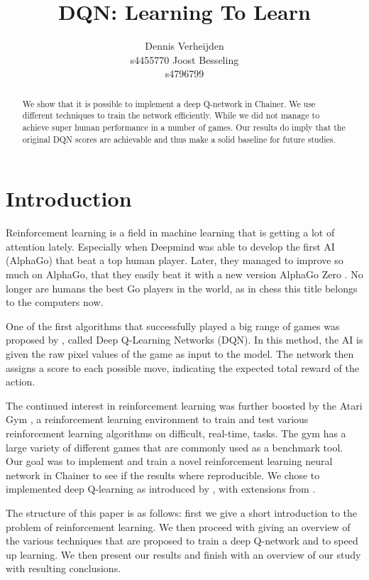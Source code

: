 \documentclass{article}
\title{DQN: Learning To Learn}
\author{
  Dennis Verheijden\\
  s4455770
  \And
  Joost Besseling\\
  s4796799
}
\begin{document}

\maketitle

\begin{abstract}
We show that it is possible to implement a deep Q-network in Chainer. We use different techniques to train the network efficiently. While we did not manage to achieve super human performance in a number of games. Our results do imply that the original DQN scores are achievable and thus make a solid baseline for future studies.
\end{abstract}

\section{Introduction}
Reinforcement learning is a field in machine learning that is getting a lot of attention lately. Especially when Deepmind was able to develop the first AI (AlphaGo) that beat a top human player. Later, they managed to improve so much on AlphaGo, that they easily beat it with a new version AlphaGo Zero \cite{silver2017mastering}. No longer are humans the best Go players in the world, as in chess this title belongs to the computers now.

One of the first algorithms that successfully played a big range of games was proposed by \citep{mnih2013playing}, called Deep Q-Learning Networks (DQN). In this method, the AI is given the raw pixel values of the game as input to the model. The network then assigns a score to each possible move, indicating the expected total reward of the action.

The continued interest in reinforcement learning was further boosted by the Atari Gym \cite{1606.01540}, a reinforcement learning environment to train and test various reinforcement learning algorithms on difficult, real-time, tasks. The gym has a large variety of different games that are commonly used as a benchmark tool. Our goal was to implement and train a novel reinforcement learning neural network in Chainer \cite{chainer_learningsys2015} to see if the results where reproducible. We chose to implemented deep Q-learning as introduced by \cite{mnih2013playing}, with extensions from \cite{mnih2015human}.

The structure of this paper is as follows: first we give a short introduction to the problem of reinforcement learning. We then proceed with giving an overview of the various techniques that are proposed to train a deep Q-network and to speed up learning. We then present our results and finish with an overview of our study with resulting conclusions.
\end{document}

